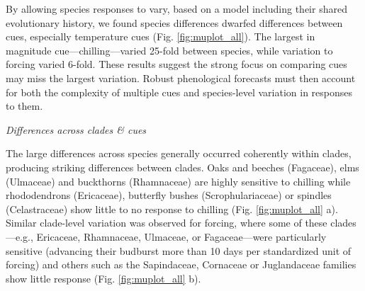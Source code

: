 \documentclass{article}\usepackage[]{graphicx}\usepackage[]{color}
\begin{document}
By allowing species responses to vary, based on a model including their shared evolutionary history, we found species differences dwarfed differences between cues, especially temperature cues (Fig. \ref{fig:muplot_all}). The largest in magnitude cue---chilling---varied 25-fold between species, while variation to forcing varied 6-fold. These results suggest the strong focus on comparing cues may miss the largest variation. Robust phenological forecasts must then account for both the complexity of multiple cues and species-level variation in responses to them.

\emph{Differences across clades \& cues}

The large differences across species generally occurred coherently within clades, producing striking differences between clades. Oaks and beeches (Fagaceae), elms (Ulmaceae) and buckthorns (Rhamnaceae) are highly sensitive to chilling while rhododendrons (Ericaceae), butterfly bushes (Scrophulariaceae) or spindles (Celastraceae) show little to no response to chilling (Fig. \ref{fig:muplot_all} a). %
Similar clade-level variation was observed for forcing, where some of these clades---e.g., Ericaceae, Rhamnaceae, Ulmaceae, or Fagaceae---were particularly sensitive (advancing their budburst more than 10 days per standardized unit of forcing) and others such as the Sapindaceae, Cornaceae or Juglandaceae families show little response (Fig. \ref{fig:muplot_all} b). %
\end{document}
